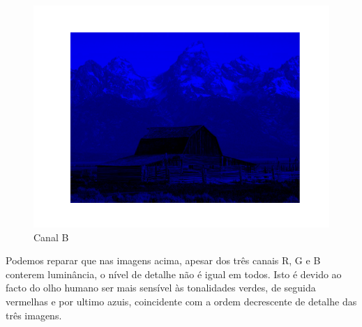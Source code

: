 \documentclass[a4paper, 12pt]{article}
\begin{document}
\begin{multicols}{3}
            \begin{figure}[H]
                \includegraphics[width=\linewidth]{resources/Exercicio4/B.png}
                \caption{\label{fig:my_label} Canal B}
            \end{figure}
        \end{multicols}
        Podemos reparar que nas imagens acima, apesar dos três canais R, G e B  conterem luminância, o nível de detalhe não é igual em todos. Isto é devido ao facto do olho humano ser mais sensível às tonalidades verdes, de seguida vermelhas e por ultimo azuis, coincidente com a ordem decrescente de detalhe das três imagens.   
        
\end{document}
